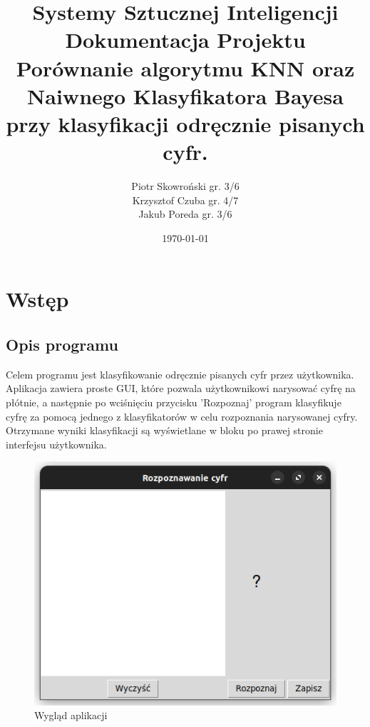 \documentclass[12pt,a4paper]{article}
\begin{document}
\title{Systemy Sztucznej Inteligencji\\\small
	{Dokumentacja Projektu\\Porównanie algorytmu KNN oraz
		Naiwnego Klasyfikatora Bayesa przy klasyfikacji odręcznie pisanych cyfr.}}
\author{Piotr Skowroński gr. 3/6\\Krzysztof Czuba gr. 4/7\\Jakub Poreda gr. 3/6}
\date{\today}

\maketitle
\newpage
\section{Wstęp}
\subsection{Opis programu}
Celem programu jest klasyfikowanie odręcznie pisanych cyfr przez użytkownika. Aplikacja zawiera proste GUI,
które pozwala użytkownikowi narysować cyfrę na płótnie, a następnie po wciśnięciu przycisku 'Rozpoznaj' program
klasyfikuje cyfrę za pomocą jednego z klasyfikatorów w celu rozpoznania narysowanej cyfry. Otrzymane wyniki
klasyfikacji są wyświetlane w bloku po prawej stronie interfejsu użytkownika.
\begin{figure}[!h]
	\includegraphics{"app1.png"}
	\centering
	\caption{Wygląd aplikacji}
\end{figure}
\newpage
\end{document}
